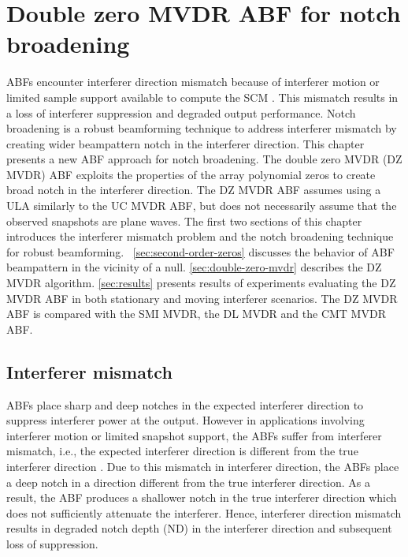 \chapter{Double zero MVDR ABF for notch broadening}
\label{ch:dzmvdr}
ABFs encounter interferer direction mismatch because of interferer
motion or limited sample support available to compute the SCM
\cite{vtree2002oap}. This mismatch results in a loss of interferer
suppression and degraded output performance. Notch broadening is a
robust beamforming technique to address interferer mismatch by
creating wider beampattern notch in the interferer direction. This
chapter presents a new ABF approach for notch broadening. The double
zero MVDR (DZ MVDR) ABF exploits the properties of the array
polynomial zeros to create broad notch in the interferer
direction. The DZ MVDR ABF assumes using a ULA similarly to the UC
MVDR ABF, but does not necessarily assume that the observed snapshots are
plane waves. The first two sections of this chapter introduces the
interferer mismatch problem and the notch broadening technique for
robust beamforming. \sect{}~\ref{sec:second-order-zeros} discusses the
behavior of ABF beampattern in the vicinity of a null.
\sect{}\ref{sec:double-zero-mvdr} describes the DZ MVDR
algorithm. \sect{}\ref{sec:results} presents results of experiments
evaluating the DZ MVDR ABF in both stationary and moving interferer
scenarios. The DZ MVDR ABF is compared with the SMI MVDR, the DL MVDR
and the CMT MVDR ABF.

\section{Interferer mismatch}
\label{sec:interferer-mismatch}
ABFs place sharp and deep notches in the expected interferer direction
to suppress interferer power at the output. However in applications
involving interferer motion or limited snapshot support, the ABFs
suffer from interferer mismatch, i.e., the expected interferer
direction is different from the true interferer direction
\cite{vtree2002oap, riba1997comm, baggeroer1999passive}. Due to this
mismatch in interferer direction, the ABFs place a deep notch in a
direction different from the true interferer direction. As a result,
the ABF produces a shallower notch in the true interferer direction
which does not sufficiently attenuate the interferer. Hence,
interferer direction mismatch results in degraded notch depth (ND) in
the interferer direction and subsequent loss of suppression.

